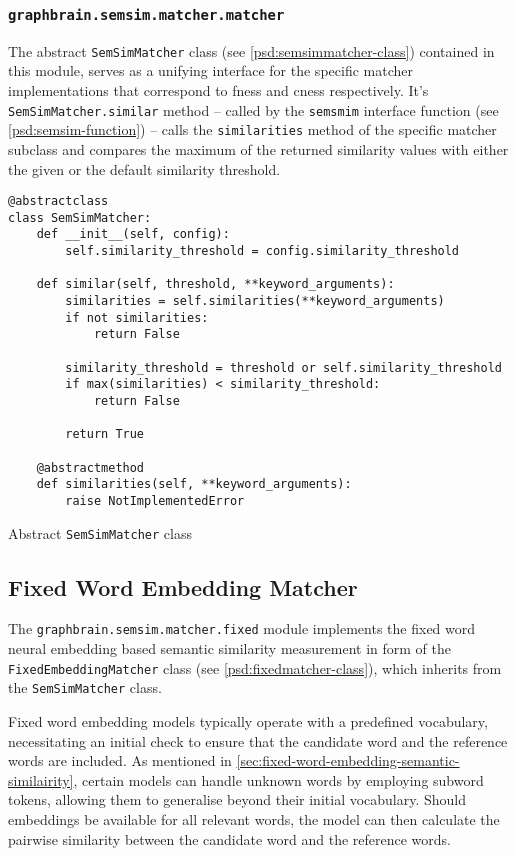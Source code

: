 \documentclass[11pt]{scrreprt}
\begin{document}
{\subsubsection{\texttt{graphbrain.semsim.matcher.matcher}}
The abstract \texttt{SemSimMatcher} class (see \cref{psd:semsimmatcher-class}) contained in this module, serves as a unifying interface for the specific matcher implementations that correspond to \gls{fness} and \gls{cness} respectively. It's \texttt{SemSimMatcher.similar} method -- called by the \texttt{semsmim} interface function (see \cref{psd:semsim-function}) -- calls the \texttt{similarities} method of the specific matcher subclass and compares the maximum of the returned similarity values with either the given or the default similarity threshold.


\begin{pseudo}
\begin{lstlisting}
@abstractclass
class SemSimMatcher:
    def __init__(self, config):
        self.similarity_threshold = config.similarity_threshold

    def similar(self, threshold, **keyword_arguments):
        similarities = self.similarities(**keyword_arguments)
        if not similarities:
            return False

        similarity_threshold = threshold or self.similarity_threshold
        if max(similarities) < similarity_threshold:
            return False

        return True

    @abstractmethod
    def similarities(self, **keyword_arguments):
        raise NotImplementedError
\end{lstlisting}
\caption{Abstract \texttt{SemSimMatcher} class}
\label{psd:semsimmatcher-class}
\end{pseudo}


\subsection{Fixed Word Embedding Matcher}
The \texttt{graphbrain.semsim.matcher.fixed} module implements the fixed word neural embedding based semantic similarity measurement in form of the \texttt{FixedEmbeddingMatcher} class (see \cref{psd:fixedmatcher-class}), which inherits from the \texttt{SemSimMatcher} class.

Fixed word embedding models typically operate with a predefined vocabulary, necessitating an initial check to ensure that the candidate word and the reference words are included. As mentioned in \cref{sec:fixed-word-embedding-semantic-similairity}, certain models can handle unknown words by employing subword tokens, allowing them to generalise beyond their initial vocabulary. Should embeddings be available for all relevant words, the model can then calculate the pairwise similarity between the candidate word and the reference words.

}
\end{document}
